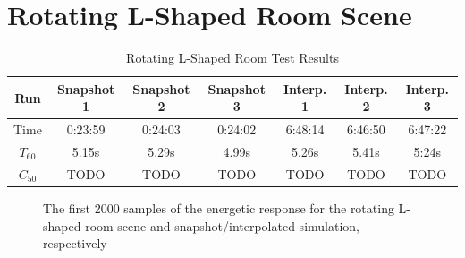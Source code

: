 \section{Rotating L-Shaped Room Scene}\label{sec:LRoom}

\begin{table}[t!]
    \centering
    \begin{tabular}{| c | c | c | c | c | c | c |}
        \hline
        Run        & Snapshot 1 & Snapshot 2 & Snapshot 3 & Interp. 1 & Interp. 2 & Interp. 3 \\
        \hline
        Time       & 0:23:59    & 0:24:03    & 0:24:02    & 6:48:14   & 6:46:50   & 6:47:22   \\
        \hline
        \(T_{60}\) & 5.15s      & 5.29s      & 4.99s      & 5.26s     & 5.41s     & 5:24s     \\
        \hline
        \(C_{50}\) & TODO       & TODO       & TODO       & TODO      & TODO      & TODO      \\
        \hline
    \end{tabular}
    \caption{Rotating L-Shaped Room Test Results}\label{tbl:LSceneTable}
\end{table}

\begin{figure}[t!]
    \begin{center}
        
    \end{center}
    \caption{The first 2000 samples of the energetic response for the rotating L-shaped room scene and snapshot/interpolated simulation, respectively}\label{fig:LSceneIR}
\end{figure}

